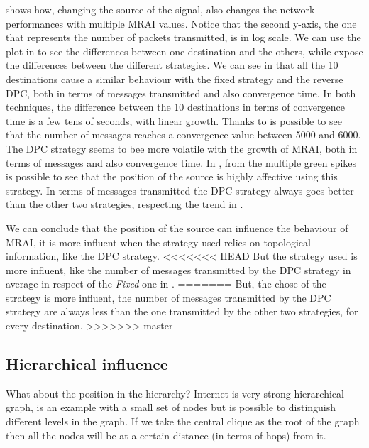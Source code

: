  shows how, changing the source of the signal,
also changes the network performances with multiple \ac{MRAI} values.
Notice that the second y-axis, the one that represents the number of packets
transmitted, is in log scale.
We can use the plot in  to see the
differences between one destination and the others, while 
expose the differences between the different strategies.
We can see in  that all the \num{10} destinations
cause a similar behaviour with the fixed strategy and the reverse \ac{DPC}, both
in terms of messages transmitted and also convergence time.
In both techniques, the difference between the \num{10} destinations in terms of
convergence time is a few tens of seconds, with linear growth.
Thanks to  is possible to see that the
number of messages reaches a convergence value between \num{5000} and
\num{6000}.
The \ac{DPC} strategy seems to bee more volatile with the growth of \ac{MRAI},
both in terms of messages and also convergence time.
In , from the multiple green spikes is possible to see
that the position of the source is highly affective using this strategy.
In terms of messages transmitted the \ac{DPC} strategy always goes better than
the other two strategies, respecting the trend in .

We can conclude that the position of the source can influence the behaviour
of \ac{MRAI}, it is more influent when the strategy used relies on topological
information, like the \ac{DPC} strategy.
<<<<<<< HEAD
But the strategy used is more influent, like the number of messages transmitted
by the \ac{DPC} strategy in average in respect of the \textit{Fixed} one in
.
=======
But, the chose of the strategy is more influent, the number of messages transmitted
by the \ac{DPC} strategy are always less than the one transmitted by the other
two strategies, for every destination.
>>>>>>> master

\subsection{Hierarchical influence}
\label{subsec:hierarchical_influence}

What about the position in the hierarchy?
Internet is very strong hierarchical graph, 
is an example with a small set of nodes but is possible to distinguish different levels
in the graph.
If we take the central clique as the root of the graph then all the nodes will
be at a certain distance (in terms of hops) from it.

